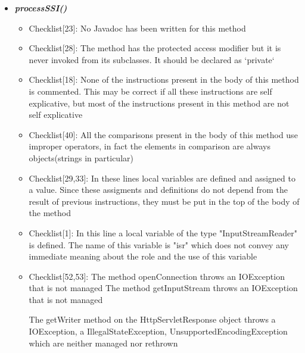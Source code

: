 \documentclass[11pt,titlepage]{article} %
\begin{document}
\begin{itemize}
   \item \textbf{\textit{processSSI()}}
    \begin{itemize}
     \item Checklist[23]: No Javadoc has been written for this method
     \item Checklist[28]: The method has the protected access modifier but it is never invoked from its subclasses. \newline It should be declared as `private`
     \item Checklist[18]: None of the instructions present in the body of this method is commented. This may be
      correct if all these instructions are self explicative, but most of the instructions
      present in this method are not self explicative
    \item Checklist[40]: All the comparisons present in the body of this method use improper operators, in fact the elements in comparison are always objects(strings in particular)
     \item Checklist[29,33]: In these lines
      local variables are defined and assigned to a value. Since these assigments and definitions
      do not depend from the result of previous instructions, they must be put in the top
      of the body of the method
      
      
     \item Checklist[1]:
      In this line a local variable of the type "InputStreamReader" is defined. The name of
      this variable is "isr" which does not convey any immediate meaning about the role and the
      use of this variable
      

     \item Checklist[52,53]:
      The method openConnection throws an IOException that is not managed\newline
      The method getInputStream throws an IOException that is not managed\newline\newline
      
      The getWriter method on the HttpServletResponse object throws a IOException, a IllegalStateException, UnsupportedEncodingException
      which are neither managed nor rethrown
      
      


\end{itemize}
\end{itemize}
\end{document}
